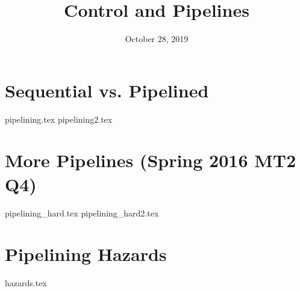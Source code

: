 \documentclass[11pt]{exam}
\title{Control and Pipelines}
\date{October 28, 2019}
\begin{document}
\maketitle

\section{Sequential vs. Pipelined}
\begin{questions}
{pipelining.tex}
{pipelining2.tex}
\end{questions}
\newpage

\section{More Pipelines (Spring 2016 MT2 Q4)}
\begin{questions}
{pipelining_hard.tex}
{pipelining_hard2.tex}
\end{questions}
\newpage

\section{Pipelining Hazards}
\begin{questions}
{hazards.tex}
\end{questions}
\end{document}

